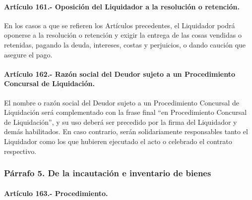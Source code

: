 \documentclass[
]{book}
\begin{document}
\hypertarget{artuxedculo-161.--oposiciuxf3n-del-liquidador-a-la-resoluciuxf3n-o-retenciuxf3n.}{%
\paragraph*{Artículo 161.- Oposición del Liquidador a la resolución o retención.}\label{artuxedculo-161.--oposiciuxf3n-del-liquidador-a-la-resoluciuxf3n-o-retenciuxf3n.}}

En los casos a que se refieren los Artículos precedentes, el Liquidador podrá oponerse a la resolución o retención y exigir la entrega de las cosas vendidas o retenidas, pagando la deuda, intereses, costas y perjuicios, o dando caución que asegure el pago.

\hypertarget{artuxedculo-162.--razuxf3n-social-del-deudor-sujeto-a-un-procedimiento-concursal-de-liquidaciuxf3n.}{%
\paragraph*{Artículo 162.- Razón social del Deudor sujeto a un Procedimiento Concursal de Liquidación.}\label{artuxedculo-162.--razuxf3n-social-del-deudor-sujeto-a-un-procedimiento-concursal-de-liquidaciuxf3n.}}

El nombre o razón social del Deudor sujeto a un Procedimiento Concursal de Liquidación será complementado con la frase final ``en Procedimiento Concursal de Liquidación'', y su uso deberá ser precedido por la firma del Liquidador y demás habilitados. En caso contrario, serán solidariamente responsables tanto el Liquidador como los que hubieren ejecutado el acto o celebrado el contrato respectivo.

\hypertarget{puxe1rrafo-5.-de-la-incautaciuxf3n-e-inventario-de-bienes}{%
\subsubsection*{Párrafo 5. De la incautación e inventario de bienes}\label{puxe1rrafo-5.-de-la-incautaciuxf3n-e-inventario-de-bienes}}

\hypertarget{artuxedculo-163.--procedimiento.}{%
\paragraph*{Artículo 163.- Procedimiento.}\label{artuxedculo-163.--procedimiento.}}
\end{document}
